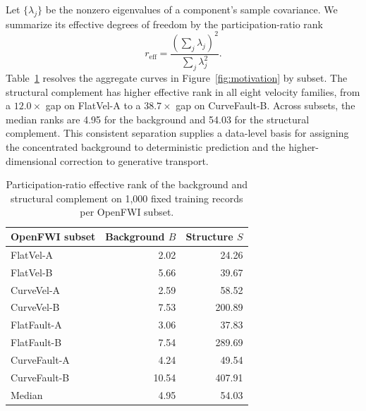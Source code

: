 Let $\{\lambda_j\}$ be the nonzero eigenvalues of a component's sample covariance. We summarize its effective degrees of freedom by the participation-ratio rank
\begin{equation}
r_{\mathrm{eff}}=\frac{\left(\sum_j\lambda_j\right)^2}{\sum_j\lambda_j^2}.
\label{eq:effective-rank}
\end{equation}
Table~\ref{tab:effective-rank} resolves the aggregate curves in Figure~\ref{fig:motivation} by subset. The structural complement has higher effective rank in all eight velocity families, from a $12.0\times$ gap on FlatVel-A to a $38.7\times$ gap on CurveFault-B. Across subsets, the median ranks are 4.95 for the background and 54.03 for the structural complement. This consistent separation supplies a data-level basis for assigning the concentrated background to deterministic prediction and the higher-dimensional correction to generative transport.

\begin{table}[H]
\centering
\small
\begin{tabular}{@{}lrr@{}}
\toprule
OpenFWI subset & Background $B$ & Structure $S$ \\
\midrule
FlatVel-A & 2.02 & 24.26 \\
FlatVel-B & 5.66 & 39.67 \\
CurveVel-A & 2.59 & 58.52 \\
CurveVel-B & 7.53 & 200.89 \\
FlatFault-A & 3.06 & 37.83 \\
FlatFault-B & 7.54 & 289.69 \\
CurveFault-A & 4.24 & 49.54 \\
CurveFault-B & 10.54 & 407.91 \\
\midrule
Median & 4.95 & 54.03 \\
\bottomrule
\end{tabular}
\caption{Participation-ratio effective rank of the background and structural complement on 1,000 fixed training records per OpenFWI subset.}
\label{tab:effective-rank}
\end{table}

\subsection{\texorpdfstring{}{Fixed-Rule Qualitative Diagnostics}}

